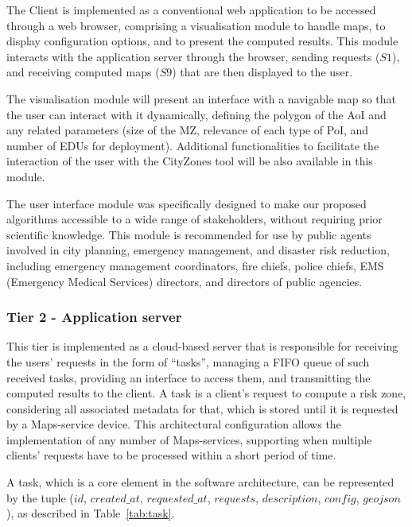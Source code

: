 \begin{refsection}
The Client is implemented as a conventional web application to be accessed through a web browser, comprising a visualisation module to handle maps, to display configuration options, and to present the computed results. This module interacts with the application server through the browser, sending requests ($S1$), and receiving computed maps ($S9$) that are then displayed to the user.

The visualisation module will present an interface with a navigable map so that the user can interact with it dynamically, defining the polygon of the AoI and any related parameters (size of the MZ, relevance of each type of PoI, and number of EDUs for deployment). Additional functionalities to facilitate the interaction of the user with the CityZones tool will be also available in this module.

The user interface module was specifically designed to make our proposed algorithms accessible to a wide range of stakeholders, without requiring prior scientific knowledge. This module is recommended for use by public agents involved in city planning, emergency management, and disaster risk reduction, including emergency management coordinators, fire chiefs, police chiefs, EMS (Emergency Medical Services) directors, and directors of public agencies.

\subsubsection{Tier 2 - Application server}

This tier is implemented as a cloud-based server that is responsible for receiving the users' requests in the form of ``tasks'', managing a FIFO queue of such received tasks, providing an interface to access them, and transmitting the computed results to the client. A task is a client's request to compute a risk zone, considering all associated metadata for that, which is stored until it is requested by a Maps-service device. This architectural configuration allows the implementation of any number of Maps-services, supporting when multiple clients' requests have to be processed within a short period of time.

A task, which is a core element in the software architecture, can be represented by the tuple ($id$, $created\_at$, $requested\_at$, $requests$, $description$, $config$, $geojson$), as described in Table~\ref{tab:task}.


\end{refsection}
